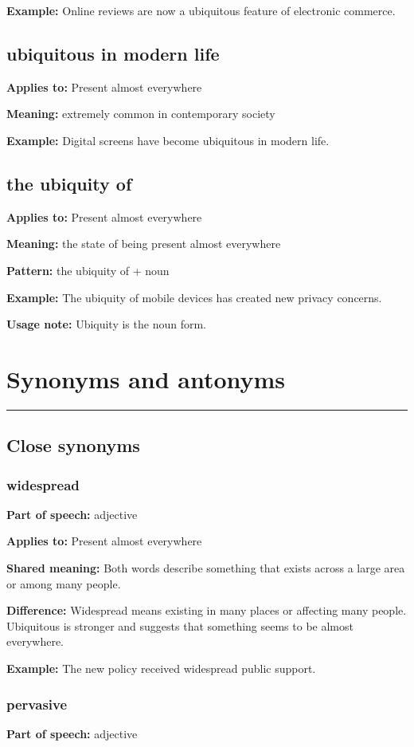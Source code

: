 \documentclass[11pt]{article}
\newcommand{\sectionrule}{\par\vspace{-0.5em}\noindent\textcolor{Accent}{\rule{\linewidth}{0.6pt}}\par}
\begin{document}
\textbf{Example:} Online reviews are now a ubiquitous feature of electronic commerce.

\subsection{ubiquitous in modern life}
\textbf{Applies to:} Present almost everywhere

\textbf{Meaning:} extremely common in contemporary society

\textbf{Example:} Digital screens have become ubiquitous in modern life.

\subsection{the ubiquity of}
\textbf{Applies to:} Present almost everywhere

\textbf{Meaning:} the state of being present almost everywhere

\textbf{Pattern:} the ubiquity of + noun

\textbf{Example:} The ubiquity of mobile devices has created new privacy concerns.

\textbf{Usage note:} Ubiquity is the noun form.

\section{Synonyms and antonyms}
\sectionrule
\subsection{Close synonyms}
\subsubsection{widespread}
\textbf{Part of speech:} adjective

\textbf{Applies to:} Present almost everywhere

\textbf{Shared meaning:} Both words describe something that exists across a large area or among many people.

\textbf{Difference:} Widespread means existing in many places or affecting many people. Ubiquitous is stronger and suggests that something seems to be almost everywhere.

\textbf{Example:} The new policy received widespread public support.

\subsubsection{pervasive}
\textbf{Part of speech:} adjective
\end{document}
